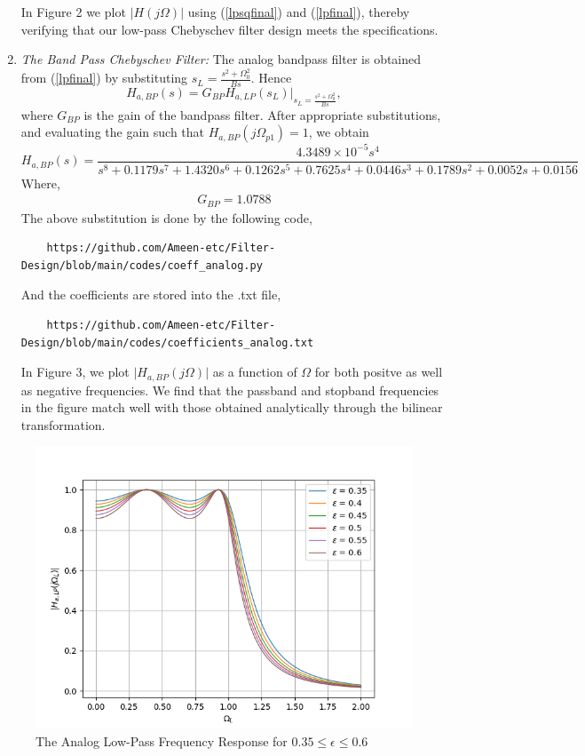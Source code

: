 \documentclass{article}
\begin{document}
\begin{enumerate}
In Figure 2 we plot $|H(j\Omega)|$ using (\ref{lpsqfinal}) and (\ref{lpfinal}), thereby verifying that our low-pass Chebyschev filter design meets the specifications.
\item {\em The Band Pass Chebyschev Filter:}  The analog bandpass filter is obtained from (\ref{lpfinal}) by substituting
$s_L = \frac{s^2 + \Omega_0^2}{Bs}$.  Hence
\begin{equation}
H_{a,BP}(s) = G_{BP}H_{a,LP}(s_L)\vert_{s_L = \frac{s^2 + \Omega_0^2}{Bs}},
\end{equation}
where $G_{BP}$ is the gain of the bandpass filter.  After appropriate substitutions, and evaluating the gain 
such that $H_{a,BP}(j\Omega_{p1}) = 1$, we obtain
{
\tiny
\begin{equation}
\label{bpfinal}
H_{a,BP}(s) = \frac{4.3489\times 10^{-5}s^4}{s^8+0.1179s^7+1.4320s^6+0.1262s^5+0.7625s^4+0.0446s^3+0.1789s^2+0.0052s+0.0156}
\end{equation}
}
Where,
\begin{align}
    G_{BP} = 1.0788
\end{align}
The above substitution is done by the following code,
\begin{lstlisting}
    https://github.com/Ameen-etc/Filter-Design/blob/main/codes/coeff_analog.py
\end{lstlisting}
And the coefficients are stored into the .txt file,
\begin{lstlisting}
    https://github.com/Ameen-etc/Filter-Design/blob/main/codes/coefficients_analog.txt
\end{lstlisting}
In Figure 3, we plot $\vert H_{a,BP}(j\Omega)\vert$ as a function of $\Omega$ for both positve as
well as negative frequencies.  We find that the passband and stopband frequencies in the figure
match well with those obtained analytically through the bilinear transformation.
\end{enumerate}
\begin{figure}
\label{fig1}
\includegraphics[width = 15cm]{figs/figure1.png}
\caption{The Analog Low-Pass Frequency Response for $0.35 \leq \epsilon \leq 0.6$}
\end{figure}
\end{document}
